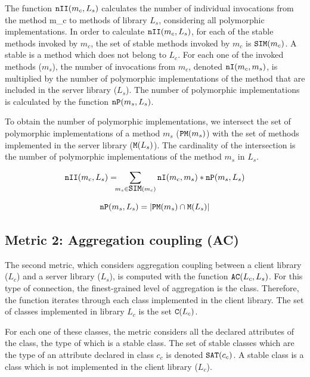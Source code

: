 \documentclass[a4paper]{article}
\begin{document}
The function $\verb|nII|(m_c,L_s)$ calculates the number of individual invocations from the method m\_c to methods of library $L_s$, considering all polymorphic implementations. In order to calculate $\verb|nII|(m_c,L_s)$, for each of the stable methods invoked by $m_c$, the set of stable methods invoked by $m_c$ is $\verb|SIM|(m_c)$. A stable is a method which does not belong to $L_c$.
For each one of the invoked methods ($m_s$), the number of invocations from $m_c$, denoted $\verb|nI|(m_c, m_s)$, is multiplied by the number of polymorphic implementations of the method that are included in the server library ($L_s$). The number of polymorphic implementations is calculated by the function $\verb|nP|(m_s, L_s)$.

To obtain the number of polymorphic implementations, we intersect the set of polymorphic implementations of a method $m_s$ ($\verb|PM|(m_s)$) with the set of methods implemented in the server library ($\verb|M|(L_s)$). The cardinality of the intersection is the number of polymorphic implementations of the method $m_s$ in $L_s$.

\begin{equation*}
   \verb|nII|(m_c, L_s) =\!\!\! \sum_{m_s \in \verb|SIM|(m_c)} \verb|nI|(m_c, m_s)*\verb|nP|(m_s, L_s)
\end{equation*}

\begin{equation*}
    \verb|nP|(m_s, L_s) = |\verb|PM|(m_s) \cap \verb|M|(L_s)|
\end{equation*}

\subsection{Metric 2: Aggregation coupling (AC)}
The second metric, which considers aggregation coupling between a client library ($L_c$) and a server library ($L_s$), is computed with the function $\verb|AC|(L_c, L_s)$. For this type of connection, the finest-grained level of aggregation is the class. Therefore, the function iterates through each class implemented in the client library. The set of classes implemented in library $L_c$ is the set $\verb|C|(L_c)$.

For each one of these classes, the metric considers all the declared attributes of the class, the type of which is a stable class. The set of  stable classes which are the type of an attribute declared in class $c_c$ is denoted $\verb|SAT|(c_c)$. A stable class is a class which is not implemented in the client library ($L_c$).
\end{document}
